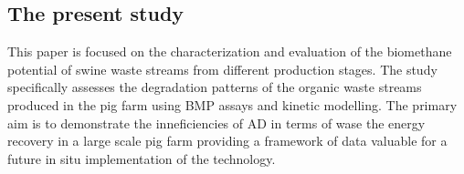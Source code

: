\subsection{The present study}
This paper is focused on the characterization and evaluation of the biomethane potential of swine waste streams from different production stages. The study specifically assesses the degradation patterns of the organic waste streams produced in the pig farm using BMP assays and kinetic modelling. The primary aim is to demonstrate the inneficiencies of AD in terms of wase the energy recovery in a large scale pig farm providing a framework of data valuable for a future in situ implementation of the technology.